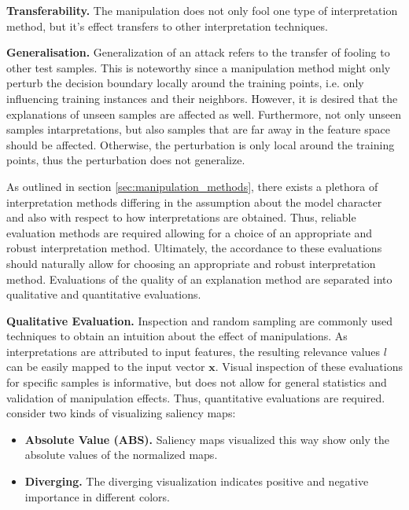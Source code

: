 \documentclass[sigconf]{acmart}
\newcommand{\mypar}[1]{\vspace{0.2cm}\noindent\textbf{#1}}
\begin{document}
\mypar{Transferability.} The manipulation does not only fool one type of interpretation method, but it's effect transfers to other interpretation techniques. 


\mypar{Generalisation.} Generalization of an attack refers to the transfer of fooling to other test samples. This is noteworthy since a manipulation method might only perturb the decision boundary locally around the training points, i.e. only influencing training instances and their neighbors. However, it is desired that the explanations of unseen samples are affected as well. Furthermore, not only unseen samples intarpretations, but also samples that are far away in the feature space should be affected. 
Otherwise, the perturbation is only local around the training points, thus the perturbation does not generalize. 
\par\smallskip
As outlined in section \autoref{sec:manipulation_methods}, there exists a plethora of interpretation methods differing in the assumption about the model character and also with respect to how interpretations are obtained. Thus, reliable evaluation methods are required allowing for a choice of an appropriate and robust interpretation method. Ultimately, the accordance to these evaluations should naturally allow for choosing an appropriate and robust interpretation method.  
Evaluations of the quality of an explanation method are separated into qualitative and quantitative evaluations. 

\mypar{Qualitative Evaluation.} 
Inspection and random sampling are commonly used techniques to obtain an intuition about the effect of manipulations. 
As interpretations are attributed to input features, the resulting relevance values $l$ can be easily mapped to the input vector $\mathbf{x}$. Visual inspection of these evaluations for specific samples is informative, but does not allow for general statistics and validation of manipulation effects. Thus, quantitative evaluations are required. 
\cite{adebayo2018sanity} consider two kinds of visualizing saliency maps: 
\begin{itemize}
    \item \textbf{Absolute Value (ABS).} Saliency maps visualized this way show only the absolute values of the normalized maps.
    \item \textbf{Diverging. } The diverging visualization indicates positive and negative importance in different colors. 
\end{itemize}
\end{document}
